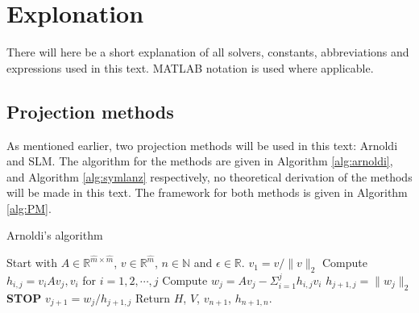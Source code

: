\chapter{Explonation}
There will here be a short explanation of all solvers, constants, abbreviations and expressions used in this text. MATLAB notation is used where applicable.

\section{Projection methods}%
As mentioned earlier, two projection methods will be used in this text: Arnoldi and SLM. The algorithm for the methods are given in Algorithm \ref{alg:arnoldi}, and Algorithm \ref{alg:symlanz} respectively, no theoretical derivation of the methods will be made in this text. The framework for both methods is given in Algorithm \ref{alg:PM}. \\

\begin{algorithm} [h!]
\begin{algorithmic} \caption{Arnoldi's algorithm\cite{arnold}} \label{alg:arnoldi}  
\STATE Start with $A \in \mathbb{R}^{\hat{m} \times \hat{m}}$, $v \in \mathbb{R}^{\hat{m}}$, $n \in \mathbb{N}$ and $\epsilon \in \mathbb{R}$.
\STATE $v_1 = v/\|v \|_2$
   \STATE Compute $h_{i,j} =  v_iAv_j,v_i $ for $i = 1,2,\cdots, j$
    \STATE Compute $w_j = A v_j - \Sigma_{i=1}^{j} h_{i,j}v_i $
    \STATE $h_{j+1,j} = \| w_j \|_2$
        \STATE\textbf{STOP}
    \ENDIF 
   \STATE $v_{j+1} = w_j/h_{j+1,j}$
\ENDFOR
\STATE Return $H$, $V$, $v_{n+1}$, $h_{n+1,n}$.
\end{algorithmic} 
\end{algorithm}

